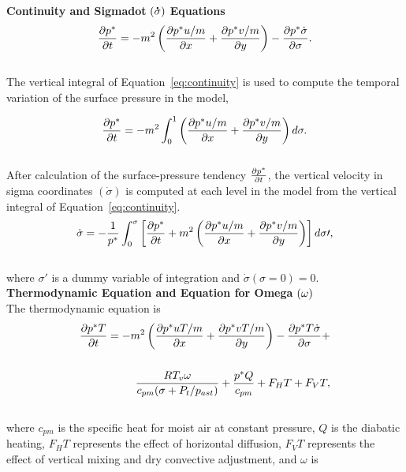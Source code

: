 \noindent 
{\bf Continuity and Sigmadot} $({\bf \dot{\sigma}})$ {\bf  Equations}
\begin{eqnarray} \label{eq:continuity}
{{\partial{p^{\ast}} \over \partial{t}}} = -m^2 \left( {\partial{p^{\ast}u/m} 
\over \partial{x}} + {\partial{p^{\ast}v/m} \over \partial{y}} \right) -
{\partial{p^{\ast}\dot{\sigma}} \over \partial{\sigma}}.
\end{eqnarray} \\
\noindent
The vertical integral of Equation~\ref{eq:continuity} is used to compute the 
temporal variation of the surface pressure in the model,

\begin{eqnarray}
{{\partial{p^{\ast}} \over \partial{t}}} = -m^2 \int_{0}^{1} \left( {\partial{p^{\ast}u/m} 
\over \partial{x}} + {\partial{p^{\ast}v/m} \over \partial{y}} \right) d\sigma.
\end{eqnarray} \\
\noindent
After calculation of the surface-pressure tendency ${\partial{p^{\ast}} \over 
\partial{t}}$, the vertical velocity in sigma coordinates $(\dot{\sigma})$ is 
computed at each level in the model from the vertical integral of 
Equation~\ref{eq:continuity}.
\begin{eqnarray}
\dot{\sigma} = - {1 \over p^{\ast}} \int_{0}^{\sigma} \left[ 
{\partial{p^{\ast}} \over \partial{t}} + m^2 \left( {\partial{p^{\ast}u/m} 
\over \partial{x}} + {\partial{p^{\ast}v/m} \over \partial{y}} \right) 
\right] d\sigma\prime,
\end{eqnarray} \\
\noindent
where $\sigma\prime$ is a dummy variable of integration and $\dot{\sigma}(\sigma=0)=0$.
\\
\newpage
\noindent
{\bf Thermodynamic Equation and Equation for Omega} ${\bf (\omega)}$ \\
\noindent 
The thermodynamic equation is
\begin{eqnarray}
\nonumber
{{\partial{p^{\ast}T} \over \partial{t}}} = -m^2 \left( {\partial{p^{\ast}uT/m} 
\over \partial{x}} + {\partial{p^{\ast}vT/m} \over \partial{y}} \right) -
{\partial{p^{\ast}T\dot{\sigma}} \over \partial{\sigma}} +  \\ \nonumber
\\
{RT_v\omega \over c_{pm}(\sigma + P_t/p_{ast})} + {p^{\ast}Q \over c_{pm}} +
F_HT + F_VT,
\end{eqnarray} \\
\noindent
where $c_{pm}$ is the specific heat for moist air at constant pressure, $Q$ is 
the diabatic heating, $F_HT$ represents the effect of horizontal diffusion,
$F_VT$ represents the effect of vertical mixing and dry convective adjustment, and 
$\omega$ is

